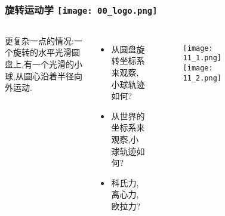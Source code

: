 
\begin{frame}
  \frametitle{旋转运动学 \hfill \texttt{[image: 00\_logo.png]}}
  \begin{columns}
    更复杂一点的情况:一个旋转的水平光滑圆盘上,有一个光滑的小球,从圆心沿着半径向外运动.
    
    \begin{itemize}
      \item 从圆盘旋转坐标系来观察,小球轨迹如何?
      \item 从世界的坐标系来观察,小球轨迹如何?
      \item 科氏力,离心力,欧拉力?
      
    \end{itemize}

    \begin{figure}[h]
      \texttt{[image: 11\_1.png]}
      \qquad
      \texttt{[image: 11\_2.png]}

    \end{figure}
    \begin{figure}[h]
    \end{figure}
    
  \end{columns}
  \end{frame}



